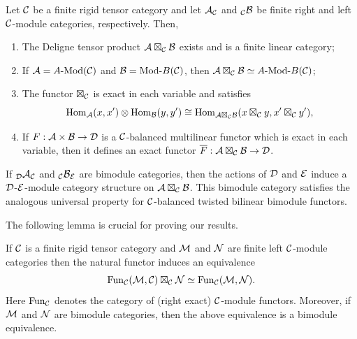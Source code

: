 \documentclass{amsart}
\begin{document}
\begin{theorem} \label{thm:DelignePrdtOverATCExists}
	Let $\mathcal C$ be a finite rigid tensor category and let $\mathcal A_{\mathcal C}$ and ${}_{\mathcal C}\mathcal B$ be finite right and left $\mathcal C$-module categories, respectively. Then,
	\begin{enumerate}
		\item The Deligne tensor product $\mathcal A \boxtimes_{\mathcal C} \mathcal B$ exists and is a finite linear category;
		\item If $\cA = \Mod{A}{}(\cC)$ and $\cB = \Mod{}{B}(\cC)$, then $\cA \boxtimes_{\cC} \cB \simeq \Mod{A }{B}(\cC)$;

		\item The functor $\boxtimes_{\mathcal C}$ is exact in each variable and satisfies 
		\begin{equation*}
			\operatorname{Hom}_{\mathcal A}(x,x') \otimes \operatorname{Hom}_{\mathcal B}(y, y') \cong \operatorname{Hom}_{\mathcal A \boxtimes_{\mathcal C} \mathcal B} (x \boxtimes_{\mathcal C} y, x' \boxtimes_{\mathcal C} y'),
		\end{equation*}
		\item If $F: \mathcal A \times \mathcal B \to \mathcal D$ is a $\mathcal C$-balanced multilinear functor which is exact in each variable, then it defines an exact functor $\overline{F}: \mathcal A \boxtimes_{\mathcal C} \mathcal B \to \mathcal D$. 
	\end{enumerate} 
\end{theorem}


\begin{remark}
	If ${}_{\mathcal D}\mathcal A_{\mathcal C}$ and ${}_{\mathcal C}\mathcal B_{\mathcal E}$ are bimodule categories, then the actions of $\mathcal D$ and $\mathcal E$ induce a $\mathcal D$-$\mathcal E$-module category structure on $\mathcal A \boxtimes_{\mathcal C} \mathcal B$. This bimodule category satisfies the analogous universal property for $\mathcal C$-balanced twisted bilinear bimodule functors. 
\end{remark}

The following lemma is crucial for proving our results.

\begin{lemma} \label{Lma:FunctorsAsATensorPdt}
	If $\mathcal C$ is a finite rigid tensor category and $\mathcal M$ and $\mathcal N$ are finite left $\mathcal C$-module categories then the natural functor induces an equivalence
	\begin{equation*}
		\operatorname{Fun}_\mathcal C(\mathcal M, \mathcal C) \boxtimes_\mathcal C \mathcal N \simeq \operatorname{Fun}_\mathcal C(\mathcal M,\mathcal N).
	\end{equation*}
	Here $\operatorname{Fun}_\mathcal C$ denotes the category of (right exact) $\mathcal C$-module functors. 
	Moreover, if $\mathcal M$ and $\mathcal N$ are bimodule categories, then the above equivalence is a bimodule equivalence. 
\end{lemma}
\end{document}

